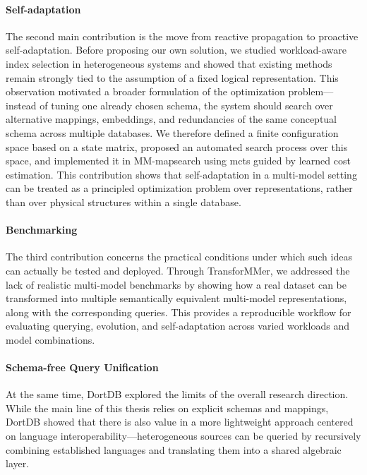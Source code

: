 \paragraph{Self-adaptation}
The second main contribution is the move from reactive propagation to proactive self-adaptation. Before proposing our own solution, we studied workload-aware index selection in heterogeneous systems and showed that existing methods remain strongly tied to the assumption of a fixed logical representation. This observation motivated a broader formulation of the optimization problem---instead of tuning one already chosen schema, the system should search over alternative mappings, embeddings, and redundancies of the same conceptual schema across multiple databases. We therefore defined a finite configuration space based on a state matrix, proposed an automated search process over this space, and implemented it in MM-mapsearch using \acrshort{mcts} guided by learned cost estimation. This contribution shows that self-adaptation in a multi-model setting can be treated as a principled optimization problem over representations, rather than over physical structures within a single database.

\paragraph{Benchmarking}
The third contribution concerns the practical conditions under which such ideas can actually be tested and deployed. Through TransforMMer, we addressed the lack of realistic multi-model benchmarks by showing how a real dataset can be transformed into multiple semantically equivalent multi-model representations, along with the corresponding queries. This provides a reproducible workflow for evaluating querying, evolution, and self-adaptation across varied workloads and model combinations.

\paragraph{Schema-free Query Unification}
At the same time, DortDB explored the limits of the overall research direction. While the main line of this thesis relies on explicit schemas and mappings, DortDB showed that there is also value in a more lightweight approach centered on language interoperability---heterogeneous sources can be queried by recursively combining established languages and translating them into a shared algebraic layer.
\\

